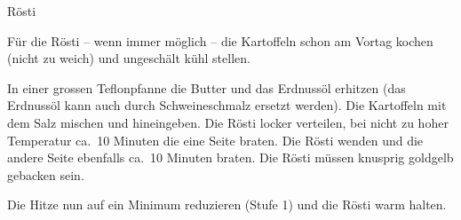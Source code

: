\begin{recipe}{Rösti}
    \label{rosti}

    \begin{ingredients}
    \end{ingredients}

    \begin{instructions}
        Für die Rösti -- wenn immer möglich -- die Kartoffeln schon am Vortag kochen (nicht zu weich) und ungeschält kühl stellen.

        In einer grossen Teflonpfanne die Butter und das Erdnussöl erhitzen (das Erdnussöl kann auch durch Schweineschmalz ersetzt werden).
        Die Kartoffeln mit dem Salz mischen und hineingeben.
        Die Rösti locker verteilen, bei nicht zu hoher Temperatur ca.\ 10 Minuten die eine Seite braten. Die Rösti wenden und die andere Seite ebenfalls ca.\ 10 Minuten braten.
        Die Rösti müssen knusprig goldgelb gebacken sein.

        Die Hitze nun auf ein Minimum reduzieren (Stufe 1) und die Rösti warm halten.
    \end{instructions}
\end{recipe}
